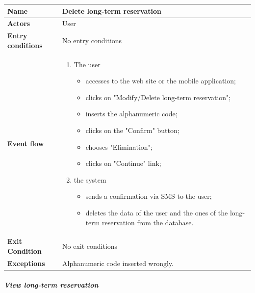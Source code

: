		\noindent
		\begin{tabular}{l l}
		 \textbf {Name} & Delete long-term reservation  \\ \hline
		 \textbf{Actors} & User \\ \hline
		 \textbf{Entry conditions} & No entry conditions \\ \hline
		 \textbf{Event flow} & 
		 \parbox{0.7\textwidth}{
		 \begin{enumerate}
		 \item The user
		 \begin{itemize}
		 \item accesses to the web site or the mobile application;
		 \item clicks on "Modify/Delete long-term reservation";
		 \item inserts the alphanumeric code;
		 \item clicks on the "Confirm" button;
		 \item chooses "Elimination";
		 \item clicks on "Continue" link;
		 \end{itemize}
		 \item the system
		 \begin{itemize}
		 \item sends a confirmation via SMS to the user;
		 \item deletes the data of the user and the ones of the long-term reservation from the database.
		 \end{itemize}
		 \end{enumerate}
		 } \\ \hline
		 \textbf{Exit Condition} & No exit conditions \\ \hline
		 \textbf{Exceptions} & Alphanumeric code inserted wrongly.
		\end{tabular}
		\newpage
		\subparagraph{View long-term reservation}
		~\\[0.2cm]
		\vspace{20pt}
		\noindent
